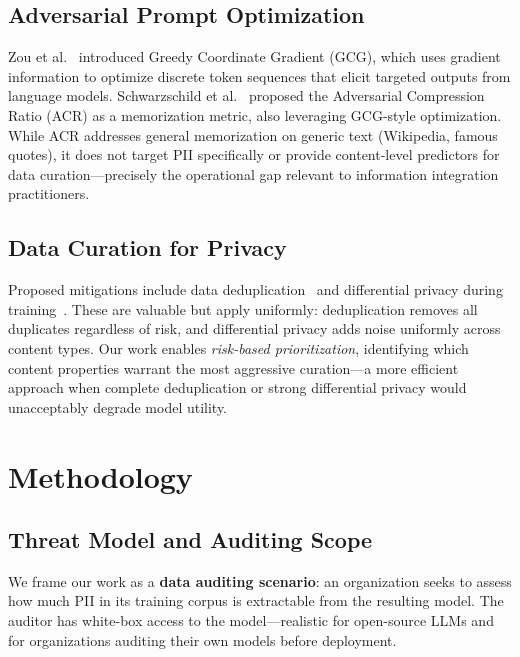 \documentclass[conference]{IEEEtran}
\begin{document}
\subsection{Adversarial Prompt Optimization}

Zou et al.~\cite{zou2023universal} introduced Greedy Coordinate Gradient (GCG), which uses gradient information to optimize discrete token sequences that elicit targeted outputs from language models. Schwarzschild et al.~\cite{schwarzschild2024rethinking} proposed the Adversarial Compression Ratio (ACR) as a memorization metric, also leveraging GCG-style optimization. While ACR addresses general memorization on generic text (Wikipedia, famous quotes), it does not target PII specifically or provide content-level predictors for data curation---precisely the operational gap relevant to information integration practitioners.

\subsection{Data Curation for Privacy}

Proposed mitigations include data deduplication~\cite{lee2022deduplicating, kandpal2022deduplicating} and differential privacy during training~\cite{abadi2016deep}. These are valuable but apply uniformly: deduplication removes all duplicates regardless of risk, and differential privacy adds noise uniformly across content types. Our work enables \emph{risk-based prioritization}, identifying which content properties warrant the most aggressive curation---a more efficient approach when complete deduplication or strong differential privacy would unacceptably degrade model utility.

\section{Methodology}
\label{sec:method}

\subsection{Threat Model and Auditing Scope}

We frame our work as a \textbf{data auditing scenario}: an organization seeks to assess how much PII in its training corpus is extractable from the resulting model. The auditor has white-box access to the model---realistic for open-source LLMs and for organizations auditing their own models before deployment.
\end{document}
